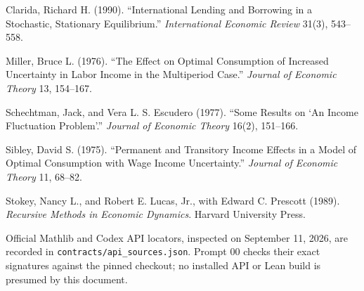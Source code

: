 \documentclass[
  11pt,
]{article}
\begin{document}
Clarida, Richard H. (1990). ``International Lending and Borrowing in a
Stochastic, Stationary Equilibrium.'' \emph{International Economic
Review} 31(3), 543--558.

Miller, Bruce L. (1976). ``The Effect on Optimal Consumption of
Increased Uncertainty in Labor Income in the Multiperiod Case.''
\emph{Journal of Economic Theory} 13, 154--167.

Schechtman, Jack, and Vera L. S. Escudero (1977). ``Some Results on `An
Income Fluctuation Problem'.'' \emph{Journal of Economic Theory} 16(2),
151--166.

Sibley, David S. (1975). ``Permanent and Transitory Income Effects in a
Model of Optimal Consumption with Wage Income Uncertainty.''
\emph{Journal of Economic Theory} 11, 68--82.

Stokey, Nancy L., and Robert E. Lucas, Jr., with Edward C. Prescott
(1989). \emph{Recursive Methods in Economic Dynamics}. Harvard
University Press.

Official Mathlib and Codex API locators, inspected on September 11,
2026, are recorded in \texttt{contracts/api\_sources.json}. Prompt 00
checks their exact signatures against the pinned checkout; no installed
API or Lean build is presumed by this document.
\end{document}
